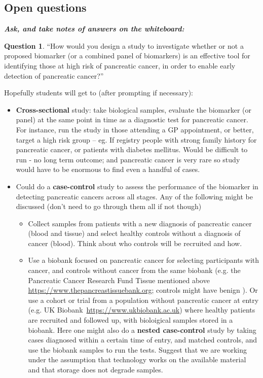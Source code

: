 \documentclass[a4paper,11pt]{scrartcl}
\theoremstyle{plain}
\theoremstyle{remark}
\theoremstyle{definition}
\newtheorem{quest}[thm]{Question}
\begin{document}
\subsection{Open questions}
\textit{\textbf{Ask, and take notes of answers on the whiteboard:}}

\begin{quest} ``How would you design a study to investigate whether or not a proposed biomarker (or a combined panel of biomarkers) is an effective tool for identifying those at high risk of pancreatic cancer, in order to enable early detection of pancreatic cancer?'' 
\end{quest}


\begin{itshape}
Hopefully students will get to (after prompting if necessary):
\begin{itemize}
	\item \textbf{Cross-sectional} study: take biological samples, evaluate the biomarker (or panel) at the same point in time as a diagnostic test for pancreatic cancer. For instance, run the study in those attending a GP appointment, or better, target a high risk group – eg. If registry people with strong family history for pancreatic cancer, or patients with diabetes mellitus. Would be difficult to run - no long term outcome; and pancreatic cancer is very rare so study would have to be enormous to find even a handful of cases.
\item Could do a \textbf{case-control} study to assess the performance of the biomarker in detecting pancreatic cancers across all stages. Any of the following might be discussed (don’t need to go through them all if not though) 
	\begin{itemize}
	\item Collect samples from patients with a new diagnosis of pancreatic cancer (blood and tissue) and select healthy controls without a diagnosis of cancer (blood). Think about who controls will be recruited and how.
	\item Use a biobank focused on pancreatic cancer for selecting participants with cancer, and controls without cancer from the same biobank (e.g. the Pancreatic Cancer Research Fund Tissue mentioned above \url{https://www.thepancreastissuebank.org}; controls might have benign ). Or use a cohort or trial from a population without pancreatic cancer at entry (e.g. UK Biobank~\url{https://www.ukbiobank.ac.uk}) where healthy patients are recruited and followed up, with bioloigical samples stored in a biobank. Here one might also do a \textbf{nested case-control} study by taking cases diagnosed within a certain time of entry, and matched controls, and use the biobank samples to run the tests. Suggest that we are working under the assumption that technology works on the available material and that storage does not degrade samples. 

\end{itemize}
\end{itemize}
\end{itshape}
\end{document}
